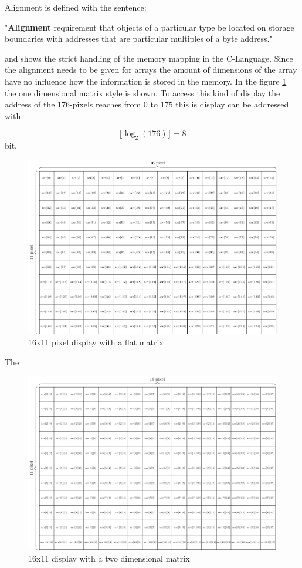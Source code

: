 Alignment is defined with the sentence:
\begin{displayquote}
	"\textbf{Alignment} requirement that objects of a particular type be located on storage boundaries with addresses that are particular multiples of a byte address."
\end{displayquote}\cite{ISO/IEC9899}

 and shows the strict handling of the memory mapping in the C-Language. Since the alignment needs to be given for arrays the amount of dimensions of the array have no influence how the information is stored in the memory. In the figure \ref{theory:matrix} the one dimensional matrix style is shown. To access this kind of display the address of the $176$-pixels reaches from $0$ to $175$ this is display can be addressed with 
 
 $$ \lfloor \log_{2}(176) \rfloor = 8$$
 bit.   

\begin{figure}[H]
	\centering
	\includegraphics[width=1\textwidth]{2-theory/drawing-graphics/graphics/matrix.pdf}
	\caption{16x11 pixel display with a flat matrix \label{theory:matrix}}
\end{figure}

The 

\begin{figure}[H]
	\centering
	\includegraphics[width=1\textwidth]{2-theory/drawing-graphics/graphics/matrix2.pdf}
	\caption{16x11 display with a two dimensional matrix\label{theory:matrix2}}
\end{figure}

